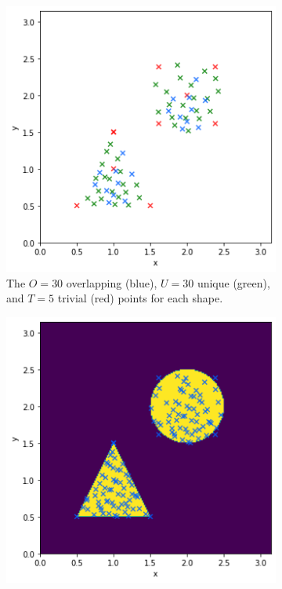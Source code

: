 \begin{figure}
  \centering
  \begin{subfigure}[t]{0.48\textwidth}
    \centering
    \includegraphics[width=\textwidth]{figures/sampling/points.png}
    \caption{The $O=30$ overlapping (blue), $U=30$ unique (green), and $T=5$
    trivial (red) points for each shape.}
  \end{subfigure}
  \begin{subfigure}[t]{0.48\textwidth}
    \centering
    \includegraphics[width=\textwidth]{figures/sampling/smokes_no_bar.png}

\end{subfigure}
\end{figure}
